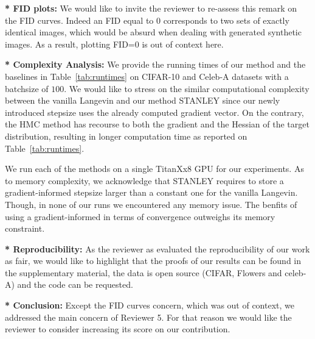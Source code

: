 \documentclass[letterpaper]{article} %
\begin{document}
\noindent \textbf{* FID plots:} We would like to invite the reviewer to re-assess this remark on the FID curves. 
Indeed an FID equal to 0 corresponds to two sets of exactly identical images, which would be absurd when dealing with generated synthetic images.
As a result, plotting FID=0 is out of context here.



\noindent \textbf{* Complexity Analysis:} We provide the running times of our method and the baselines in Table~\ref{tab:runtimes} on CIFAR-10 and Celeb-A datasets with a batchsize of $100$.
We would like to stress on the similar computational complexity between the vanilla Langevin and our method STANLEY since our newly introduced stepsize uses the already computed gradient vector. 
On the contrary, the HMC method has recourse to both the gradient and the Hessian of the target distribution, resulting in longer computation time as reported on Table~\ref{tab:runtimes}.

\begin{table}[h]
\small
\caption{ Runtime (in s) for training our EBM during 1 epoch.}\label{tab:runtimes}
	\vspace{-0.1in}
\end{table}
We run each of the methods on a single TitanXx8 GPU for our experiments. As to memory complexity, we acknowledge that STANLEY requires to store a gradient-informed stepsize larger than a constant one for the vanilla Langevin. Though, in none of our runs we encountered any memory issue. The benfits of using a gradient-informed in terms of convergence outweighs its memory constraint.

\noindent \textbf{* Reproducibility:} As the reviewer as evaluated the reproducibility of our work as fair, we would like to highlight that the proofs of our results can be found in the supplementary material, the data is open source (CIFAR, Flowers and celeb-A) and the code can be requested.

\noindent \textbf{* Conclusion:} Except the FID curves concern, which was out of context, we addressed the main concern of Reviewer 5. For that reason we would like the reviewer to consider increasing its score on our contribution.
\end{document}
